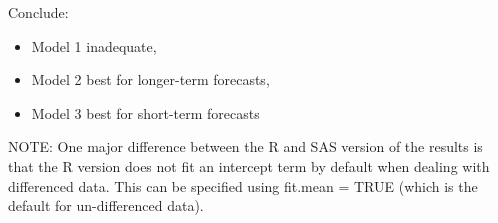 \documentclass{article}\usepackage[]{graphicx}\usepackage[]{color}
\begin{document}
Conclude: 
\begin{itemize}
\item Model 1 inadequate, \\
\item Model 2 best for longer-term forecasts, \\
\item Model 3 best for short-term forecasts 
\end{itemize}

NOTE: One major difference between the R and SAS version of the results is that the R version does not fit an intercept term by default when dealing with differenced data. This can be specified using fit.mean = TRUE (which is the default for un-differenced data). 
\end{document}

